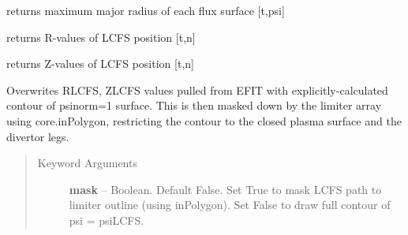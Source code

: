 \documentclass[letterpaper,10pt,english]{sphinxmanual}
\begin{document}
\begin{fulllineitems}
\begin{fulllineitems}
\end{fulllineitems}


\begin{fulllineitems}
\label{eqtools:eqtools.EFIT.EFITTree.getRmidPsi}
returns maximum major radius of each flux surface {[}t,psi{]}

\end{fulllineitems}


\begin{fulllineitems}
\label{eqtools:eqtools.EFIT.EFITTree.getRLCFS}
returns R-values of LCFS position {[}t,n{]}

\end{fulllineitems}


\begin{fulllineitems}
\label{eqtools:eqtools.EFIT.EFITTree.getZLCFS}
returns Z-values of LCFS position {[}t,n{]}

\end{fulllineitems}


\begin{fulllineitems}
\label{eqtools:eqtools.EFIT.EFITTree.remapLCFS}
Overwrites RLCFS, ZLCFS values pulled from EFIT with explicitly-calculated contour
of psinorm=1 surface.  This is then masked down by the limiter array using core.inPolygon,
restricting the contour to the closed plasma surface and the divertor legs.
\begin{quote}\begin{description}
\item[{Keyword Arguments}] \leavevmode
\textbf{mask} --
Boolean.
Default False.  Set True to mask LCFS path to limiter outline (using inPolygon).
Set False to draw full contour of psi = psiLCFS.

\end{description}\end{quote}

\end{fulllineitems}


\end{fulllineitems}
\end{document}

